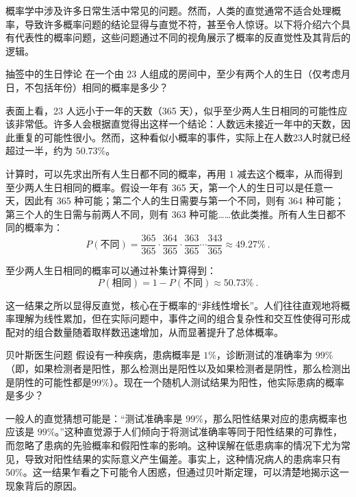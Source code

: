 
概率学中涉及许多日常生活中常见的问题。然而，人类的直觉通常不适合处理概率，导致许多概率问题的结论显得与直觉不符，甚至令人惊讶。以下将介绍六个具有代表性的概率问题，这些问题通过不同的视角展示了概率的反直觉性及其背后的逻辑。

\begin{example}{抽签中的生日悖论}
在一个由 23 人组成的房间中，至少有两个人的生日（仅考虑月日，不包括年份）相同的概率是多少？
\end{example}

表面上看，23 人远小于一年的天数（365 天），似乎至少两人生日相同的可能性应该非常低。许多人会根据直觉得出这样一个结论：人数远未接近一年中的天数，因此重复的可能性很小。然而，这种看似小概率的事件，实际上在人数23人时就已经超过一半，约为 $50.73\%$。

计算时，可以先求出所有人生日都不同的概率，再用 $1$ 减去这个概率，从而得到至少两人生日相同的概率。假设一年有 365 天，第一个人的生日可以是任意一天，因此有 365 种可能；第二个人的生日需要与第一个不同，则有 364 种可能；第三个人的生日需与前两人不同，则有 363 种可能……依此类推。所有人生日都不同的概率为：
\begin{equation}
P(\text{不同}) = \frac{365}{365} \cdot \frac{364}{365} \cdot \frac{363}{365} \cdots \frac{343}{365}\approx49.27\%~.
\end{equation}

至少两人生日相同的概率可以通过补集计算得到：
\begin{equation}
P(\text{相同})= 1 - P(\text{不同})\approx50.73\%~.
\end{equation}

这一结果之所以显得反直觉，核心在于概率的“非线性增长”。人们往往直观地将概率理解为线性累加，但在实际问题中，事件之间的组合复杂性和交互性使得可形成配对的组合数量随着取样数迅速增加，从而显著提升了总体概率。

\begin{example}{贝叶斯医生问题}
假设有一种疾病，患病概率是 $1\%$，诊断测试的准确率为 $99\%$（即，如果检测者是阳性，那么检测出是阳性以及如果检测者是阴性，那么检测出是阴性的可能性都是$99\%$）。现在一个随机人测试结果为阳性，他实际患病的概率是多少？
\end{example}

一般人的直觉猜想可能是：“测试准确率是 $99\%$，那么阳性结果对应的患病概率也应该是 $99\%$。”这种直觉源于人们倾向于将测试准确率等同于阳性结果的可靠性，而忽略了患病的先验概率和假阳性率的影响。这种误解在低患病率的情况下尤为常见，导致对阳性结果的实际意义产生偏差。事实上，这种情况病人的患病率只有$50\%$。这一结果乍看之下可能令人困惑，但通过贝叶斯定理，可以清楚地揭示这一现象背后的原因。

